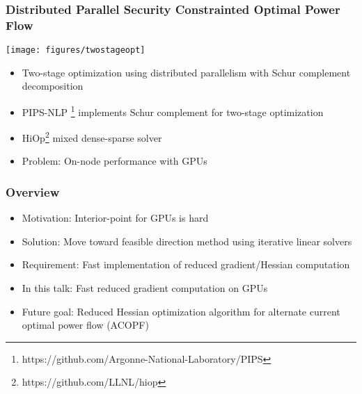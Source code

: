\begin{frame}
  \frametitle{Distributed Parallel Security Constrainted Optimal Power Flow}
  \begin{center}
    \texttt{[image: figures/twostageopt]}
  \end{center}
  \begin{itemize}
    \item Two-stage optimization using distributed parallelism with Schur complement decomposition
    \item PIPS-NLP \footnote{https://github.com/Argonne-National-Laboratory/PIPS} implements Schur complement for two-stage optimization
    \item HiOp\footnote{https://github.com/LLNL/hiop} mixed dense-sparse solver 
    \item Problem: On-node performance with GPUs
  \end{itemize}
\end{frame}

\begin{frame}
  \frametitle{Overview}
  \begin{itemize}
    \item Motivation: Interior-point for GPUs is hard
    \item Solution: Move toward feasible direction method using iterative linear solvers
    \item Requirement: Fast implementation of reduced gradient/Hessian computation
    \item In this talk: Fast reduced gradient computation on GPUs
    \item Future goal: Reduced Hessian optimization algorithm for alternate current optimal power flow (ACOPF)
  \end{itemize}
\end{frame}

